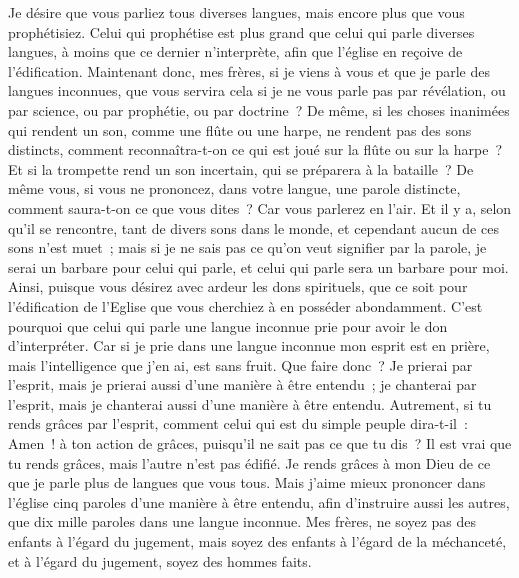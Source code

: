 \begin{multicols}{2}
Je désire que vous parliez tous diverses langues, mais encore plus que vous prophétisiez. Celui qui prophétise est plus grand que celui qui parle diverses langues, à moins que ce dernier n'interprète, afin que l'église en reçoive de l'édification.
Maintenant donc, mes frères, si je viens à vous et que je parle des langues inconnues, que vous servira cela si je ne vous parle pas par révélation, ou par science, ou par prophétie, ou par doctrine~?
De même, si les choses inanimées qui rendent un son, comme une flûte ou une harpe, ne rendent pas des sons distincts, comment reconnaîtra-t-on ce qui est joué sur la flûte ou sur la harpe~?
Et si la trompette rend un son incertain, qui se préparera à la bataille~?
De même vous, si vous ne prononcez, dans votre langue, une parole distincte, comment saura-t-on ce que vous dites~? Car vous parlerez en l'air.
Et il y a, selon qu'il se rencontre, tant de divers sons dans le monde, et cependant aucun de ces sons n'est muet~;
mais si je ne sais pas ce qu'on veut signifier par la parole, je serai un barbare pour celui qui parle, et celui qui parle sera un barbare pour moi.
Ainsi, puisque vous désirez avec ardeur les dons spirituels, que ce soit pour l'édification de l'Eglise que vous cherchiez à en posséder abondamment.
C'est pourquoi que celui qui parle une langue inconnue prie pour avoir le don d'interpréter.
Car si je prie dans une langue inconnue mon esprit est en prière, mais l'intelligence que j'en ai, est sans fruit.
Que faire donc~? Je prierai par l'esprit, mais je prierai aussi d'une manière à être entendu~; je chanterai par l'esprit, mais je chanterai aussi d'une manière à être entendu.
Autrement, si tu rends grâces par l'esprit, comment celui qui est du simple peuple dira-t-il~: Amen~! à ton action de grâces, puisqu'il ne sait pas ce que tu dis~?
Il est vrai que tu rends grâces, mais l'autre n'est pas édifié.
Je rends grâces à mon Dieu de ce que je parle plus de langues que vous tous.
Mais j'aime mieux prononcer dans l'église cinq paroles d'une manière à être entendu, afin d'instruire aussi les autres, que dix mille paroles dans une langue inconnue.
Mes frères, ne soyez pas des enfants à l'égard du jugement, mais soyez des enfants à l'égard de la méchanceté, et à l'égard du jugement, soyez des hommes faits.

\end{multicols}

